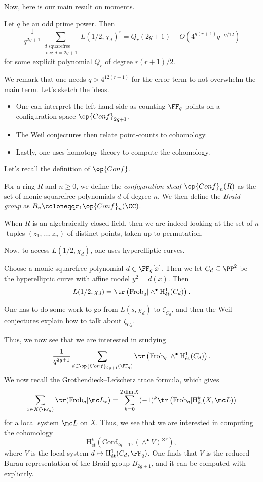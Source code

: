 \documentclass{article}
\begin{document}
Now, here is our main result on moments.
\begin{theorem}
	Let $q$ be an odd prime power. Then
	\[\frac1{q^{2g+1}}\sum_{\substack{d\text{ squarefree}\\\deg d=2g+1}}L(1/2,\chi_d)^r=Q_r(2g+1)+O\left(4^{g(r+1)}q^{-g/12}\right)\]
	for some explicit polynomial $Q_r$ of degree $r(r+1)/2$.
\end{theorem}
We remark that one needs $q>4^{12(r+1)}$ for the error term to not overwhelm the main term. Let's sketch the ideas.
\begin{itemize}
	\item One can interpret the left-hand side as counting $\FF_q$-points on a configuration space $\op{Conf}_{2g+1}$.
	\item The Weil conjectures then relate point-counts to cohomology.
	\item Lastly, one uses homotopy theory to compute the cohomology.
\end{itemize}
Let's recall the definition of $\op{Conf}$.
\begin{definition}
	For a ring $R$ and $n\ge0$, we define the \textit{configuration sheaf} $\op{Conf}_n(R)$ as the set of monic squarefree polynomials $d$ of degree $n$. We then define the \textit{Braid group} as $B_n\coloneqq\pi_1\op{Conf}_n(\CC)$.
\end{definition}
\begin{remark}
	When $R$ is an algebraically closed field, then we are indeed looking at the set of $n$-tuples $(z_1,\ldots,z_n)$ of distinct points, taken up to permutation.
\end{remark}
Now, to access $L(1/2,\chi_d)$, one uses hyperelliptic curves.
\begin{theorem}
	Choose a monic squarefree polynomial $d\in\FF_q[x]$. Then we let $C_d\subseteq\PP^2$ be the hyperelliptic curve with affine model $y^2=d(x)$. Then
	\[L(1/2,\chi_d)=\tr\left(\mathrm{Frob}_q\vert\land^\bullet\mathrm H^1_{\mathrm{\acute et}}(C_d)\right).\]
\end{theorem}
One has to do some work to go from $L(s,\chi_d)$ to $\zeta_{C_d}$, and then the Weil conjectures explain how to talk about $\zeta_{C_d}$.

Thus, we now see that we are interested in studying
\[\frac1{q^{2g+1}}\sum_{d\in\op{Conf}_{2g+1}(\FF_q)}\tr\left(\mathrm{Frob}_q\vert\land^\bullet\mathrm H^1_{\mathrm{\acute et}}(C_d)\right).\]
We now recall the Grothendieck--Lefschetz trace formula, which gives
\[\sum_{x\in X(\FF_q)}\tr(\mathrm{Frob}_q\vert\mc L_x)=\sum_{k=0}^{2\dim X}(-1)^k\tr\left(\mathrm{Frob}_q\vert\mathrm H^k_{\mathrm{\acute et}}(X,\mc L)\right)\]
for a local system $\mc L$ on $X$. Thus, we see that we are interested in computing the cohomology
\[\mathrm H^k_{\mathrm{\acute et}}\left(\mathrm{Conf}_{2g+1},(\land^\bullet V)^{\otimes r}\right),\]
where $V$ is the local system $d\mapsto\mathrm H^1_{\mathrm{\acute et}}(C_d,\FF_q)$. One finds that $V$ is the reduced Burau representation of the Braid group $B_{2g+1}$, and it can be computed with explicitly.
\end{document}

